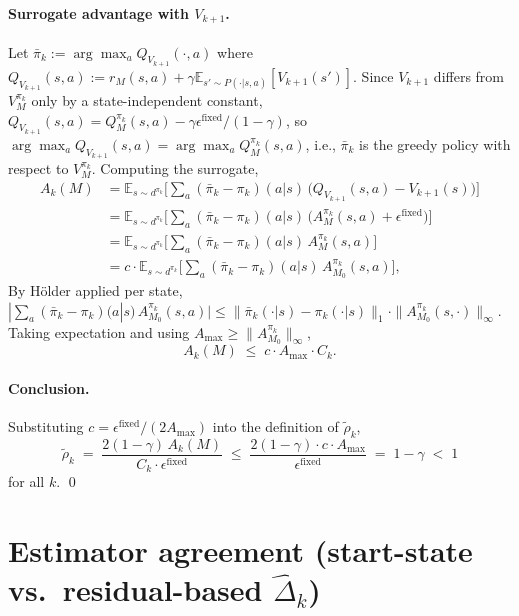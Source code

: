 \documentclass{article}
\begin{document}
\paragraph{Surrogate advantage with $V_{k+1}$.} Let $\bar\pi_k := \arg\max_a Q_{V_{k+1}}(\cdot, a)$ where $Q_{V_{k+1}}(s,a) := r_M(s,a) + \gamma \mathbb{E}_{s' \sim P(\cdot|s,a)}[V_{k+1}(s')]$. Since $V_{k+1}$ differs from $V^{\pi_k}_M$ only by a state-independent constant, $Q_{V_{k+1}}(s,a) = Q^{\pi_k}_M(s,a) - \gamma\epsilon^{\text{fixed}}/(1-\gamma)$, so $\arg\max_a Q_{V_{k+1}}(s,a) = \arg\max_a Q^{\pi_k}_M(s,a)$, i.e., $\bar\pi_k$ is the greedy policy with respect to $V^{\pi_k}_M$. Computing the surrogate,
\begin{align*}
A_k(M)
&= \mathbb{E}_{s \sim d^{\pi_k}}\!\Big[\textstyle\sum_a (\bar\pi_k - \pi_k)(a|s)\,\big(Q_{V_{k+1}}(s,a) - V_{k+1}(s)\big)\Big]\\
&= \mathbb{E}_{s \sim d^{\pi_k}}\!\Big[\textstyle\sum_a (\bar\pi_k - \pi_k)(a|s)\,\big(A^{\pi_k}_M(s,a) + \epsilon^{\text{fixed}}\big)\Big] \\
&= \mathbb{E}_{s \sim d^{\pi_k}}\!\Big[\textstyle\sum_a (\bar\pi_k - \pi_k)(a|s)\,A^{\pi_k}_M(s,a)\Big] \\
&= c \cdot \mathbb{E}_{s \sim d^{\pi_k}}\!\Big[\textstyle\sum_a (\bar\pi_k - \pi_k)(a|s)\,A^{\pi_k}_{M_0}(s,a)\Big],
\end{align*}
By Hölder applied per state, $|\sum_a (\bar\pi_k - \pi_k)(a|s)\,A^{\pi_k}_{M_0}(s,a)| \le \|\bar\pi_k(\cdot|s) - \pi_k(\cdot|s)\|_1 \cdot \|A^{\pi_k}_{M_0}(s,\cdot)\|_\infty$. Taking expectation and using $A_{\max} \ge \|A^{\pi_k}_{M_0}\|_\infty$,
\begin{equation*}
A_k(M) \;\le\; c \cdot A_{\max} \cdot C_k.
\end{equation*}

\paragraph{Conclusion.} Substituting $c = \epsilon^{\text{fixed}}/(2 A_{\max})$ into the definition of $\tilde\rho_k$,
\begin{equation*}
\tilde\rho_k \;=\; \frac{2(1-\gamma)\,A_k(M)}{C_k \cdot \epsilon^{\text{fixed}}} \;\le\; \frac{2(1-\gamma) \cdot c \cdot A_{\max}}{\epsilon^{\text{fixed}}} \;=\; 1 - \gamma \;<\; 1
\end{equation*}
for all $k$. \qed


\section{Estimator agreement (start-state vs.\ residual-based \texorpdfstring{$\hat\Delta_k$}{Delta\_k})}
\label{app:agreement}
\end{document}
